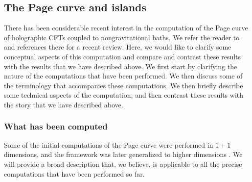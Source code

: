 \documentclass[12pt]{article}
\begin{document}
\subsection{The Page curve and islands \label{secpage}}
There has been considerable recent interest in the computation of the Page curve of holographic CFTs coupled to nongravitational baths.  We refer the reader to \cite{Almheiri:2020cfm} and references there for a recent review.  Here, we would like to clarify some conceptual aspects of this computation and compare and contrast these results with the results that we have described above. We first start by clarifying the nature of the computations that have been performed. We then discuss some of the terminology that accompanies these computations. We then briefly describe some technical aspects of the computation, and then contrast these results with the story that we have described above.

\subsubsection{What has been computed}
Some of the initial computations of the Page curve \cite{Almheiri:2019hni,Almheiri:2019yqk,Penington:2019kki} were performed in $1+1$ dimensions, and the framework was later generalized to higher dimensions \cite{Almheiri:2019psy}. We will provide a broad description that, we believe, is applicable to all the precise computations that have been performed so far.
\end{document}
